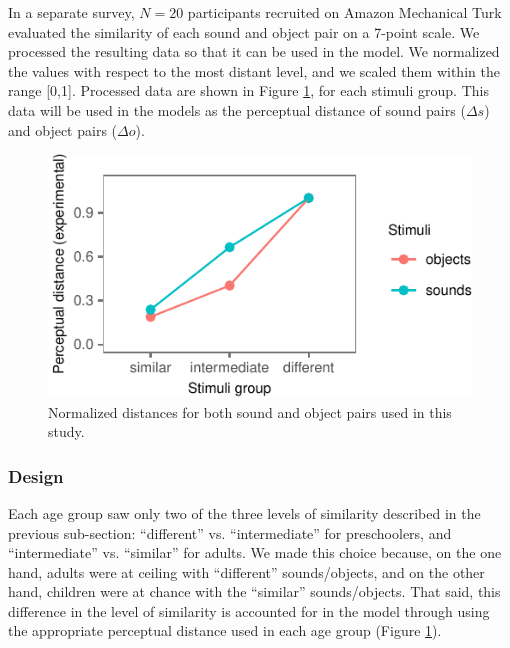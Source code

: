 \documentclass[10pt, letterpaper]{article}
\newenvironment{CodeChunk}{}{}
\begin{document}
In a separate survey, \(N=20\) participants recruited on Amazon
Mechanical Turk evaluated the similarity of each sound and object pair
on a 7-point scale. We processed the resulting data so that it can be
used in the model. We normalized the values with respect to the most
distant level, and we scaled them within the range {[}0,1{]}. Processed
data are shown in Figure \ref{fig:stim}, for each stimuli group. This
data will be used in the models as the perceptual distance of sound
pairs (\(\Delta s\)) and object pairs (\(\Delta o\)).

\begin{CodeChunk}
\begin{figure}[h]

{\centering \includegraphics{figs/stim-1} 

}

\caption{\label{fig:stim}Normalized distances for both sound and object pairs used in this study.}\label{fig:stim}
\end{figure}
\end{CodeChunk}

\subsubsection{Design}\label{design}

Each age group saw only two of the three levels of similarity described
in the previous sub-section: ``different'' vs. ``intermediate'' for
preschoolers, and ``intermediate'' vs. ``similar'' for adults. We made
this choice because, on the one hand, adults were at ceiling with
``different'' sounds/objects, and on the other hand, children were at
chance with the ``similar'' sounds/objects. That said, this difference
in the level of similarity is accounted for in the model through using
the appropriate perceptual distance used in each age group (Figure
\ref{fig:stim}).
\end{document}
